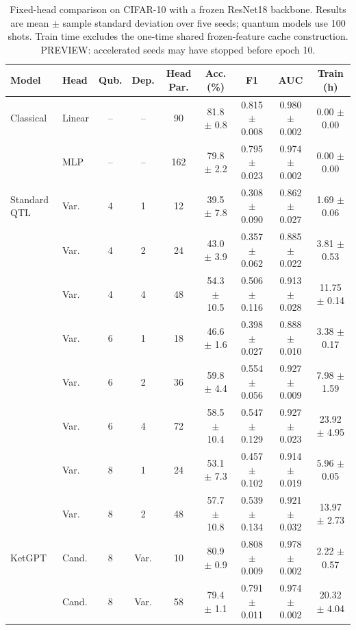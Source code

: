 \begin{table}[t]
\centering
\small
\caption{Fixed-head comparison on CIFAR-10 with a frozen ResNet18 backbone. Results are mean $\pm$ sample standard deviation over five seeds; quantum models use 100 shots. Train time excludes the one-time shared frozen-feature cache construction. PREVIEW: accelerated seeds may have stopped before epoch 10.}
\label{tab:cifar10_fixed_head}
\begin{tabular}{llccccccc}
\toprule
Model & Head & Qub. & Dep. & Head Par. & Acc. (\%) & F1 & AUC & Train (h) \\
\midrule
Classical & Linear & – & – & 90 & 81.8 $\pm$ 0.8 & 0.815 $\pm$ 0.008 & 0.980 $\pm$ 0.002 & 0.00 $\pm$ 0.00 \\
 & MLP & – & – & 162 & 79.8 $\pm$ 2.2 & 0.795 $\pm$ 0.023 & 0.974 $\pm$ 0.002 & 0.00 $\pm$ 0.00 \\
Standard QTL & Var. & 4 & 1 & 12 & 39.5 $\pm$ 7.8 & 0.308 $\pm$ 0.090 & 0.862 $\pm$ 0.027 & 1.69 $\pm$ 0.06 \\
 & Var. & 4 & 2 & 24 & 43.0 $\pm$ 3.9 & 0.357 $\pm$ 0.062 & 0.885 $\pm$ 0.022 & 3.81 $\pm$ 0.53 \\
 & Var. & 4 & 4 & 48 & 54.3 $\pm$ 10.5 & 0.506 $\pm$ 0.116 & 0.913 $\pm$ 0.028 & 11.75 $\pm$ 0.14 \\
 & Var. & 6 & 1 & 18 & 46.6 $\pm$ 1.6 & 0.398 $\pm$ 0.027 & 0.888 $\pm$ 0.010 & 3.38 $\pm$ 0.17 \\
 & Var. & 6 & 2 & 36 & 59.8 $\pm$ 4.4 & 0.554 $\pm$ 0.056 & 0.927 $\pm$ 0.009 & 7.98 $\pm$ 1.59 \\
 & Var. & 6 & 4 & 72 & 58.5 $\pm$ 10.4 & 0.547 $\pm$ 0.129 & 0.927 $\pm$ 0.023 & 23.92 $\pm$ 4.95 \\
 & Var. & 8 & 1 & 24 & 53.1 $\pm$ 7.3 & 0.457 $\pm$ 0.102 & 0.914 $\pm$ 0.019 & 5.96 $\pm$ 0.05 \\
 & Var. & 8 & 2 & 48 & 57.7 $\pm$ 10.8 & 0.539 $\pm$ 0.134 & 0.921 $\pm$ 0.032 & 13.97 $\pm$ 2.73 \\
KetGPT & Cand. #160 & 8 & Var. & 10 & 80.9 $\pm$ 0.9 & 0.808 $\pm$ 0.009 & 0.978 $\pm$ 0.002 & 2.22 $\pm$ 0.57 \\
 & Cand. #180 & 8 & Var. & 58 & 79.4 $\pm$ 1.1 & 0.791 $\pm$ 0.011 & 0.974 $\pm$ 0.002 & 20.32 $\pm$ 4.04 \\
\bottomrule
\end{tabular}
\end{table}
